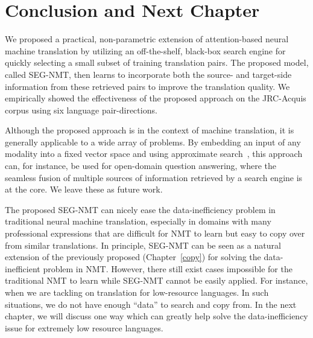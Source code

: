 \section{Conclusion and Next Chapter}

We proposed a practical, non-parametric extension of attention-based neural machine translation by utilizing an off-the-shelf, black-box search engine for quickly selecting a small subset of training translation pairs. The proposed model, called SEG-NMT, then learns to incorporate both the source- and target-side information from these retrieved pairs to improve the translation quality. We empirically showed the effectiveness of the proposed approach on the JRC-Acquis corpus using six language pair-directions. 

Although the proposed approach is in the context of machine translation, it is generally applicable to a wide array of problems. By embedding an input of any modality into a fixed vector space and using approximate search~\citep{FAISS}, this approach can, for instance, be used for open-domain question answering, where the seamless fusion of multiple sources of information retrieved by a search engine is at the core. We leave these as future work.

The proposed SEG-NMT can nicely ease the data-inefficiency problem in traditional neural machine translation, especially in domains with many professional expressions that are difficult for NMT to learn but easy to copy over from similar translations. 	In principle, SEG-NMT  can be seen as a natural extension of the previously proposed \copynet (Chapter~\ref{copy}) for solving the data-inefficient problem in NMT.  However, there still exist cases impossible for the traditional NMT to learn while SEG-NMT cannot be easily applied. For instance, when we are tackling on translation for low-resource languages. In such situations, we do not have enough ``data'' to search and copy from. In the next chapter, we will discuss one way which can greatly help solve the data-inefficiency issue for extremely low resource languages.



